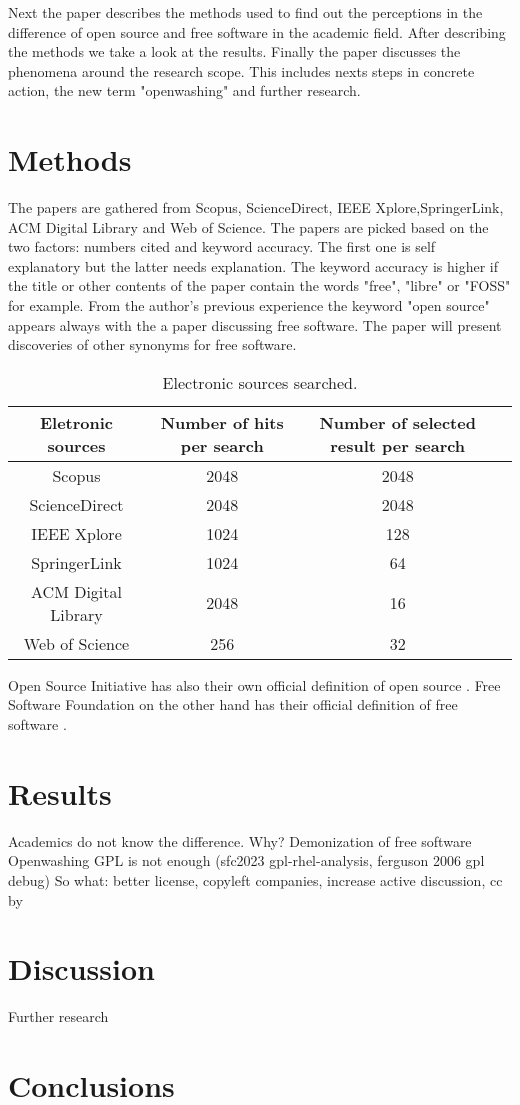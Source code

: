 \documentclass[conference]{IEEEtran}
\begin{document}
Next the paper describes the methods used to find out the perceptions in the difference of open source and free software in the academic field. After describing the methods we take a look at the results. Finally the paper discusses the phenomena around the research scope. This includes nexts steps in concrete action, the new term "openwashing" and further research.

\section{Methods}
The papers are gathered from Scopus, ScienceDirect, IEEE Xplore,SpringerLink, ACM Digital Library and Web of Science. The papers are picked based on the two factors: numbers cited and keyword accuracy. The first one is self explanatory but the latter needs explanation. The keyword accuracy is higher if the title or other contents of the paper contain the words "free", "libre" or "FOSS" for example. From the author's previous experience the keyword "open source" appears always with the a paper discussing free software. The paper will present discoveries of other synonyms for free software.

\begin{table}[htbp]
	\caption{Electronic sources searched.}
	\begin{center}
		\begin{tabular}{|c|c|c|c|}
			\hline
				Eletronic sources & Number of hits per search & Number of selected result per search\\
			\hline
			Scopus & 2048 &  2048\\
			ScienceDirect & 2048 & 2048\\
			IEEE Xplore & 1024 & 128\\
			SpringerLink & 1024 & 64\\
			ACM Digital Library & 2048 & 16\\
			Web of Science & 256 & 32\\
			\hline
		\end{tabular}
		\label{tab1}
	\end{center}
\end{table}

Open Source Initiative has also their own official definition of open source \cite{osd}. Free Software Foundation on the other hand has their official definition of free software \cite{fsd}.

\section{Results}
Academics do not know the difference. Why?
Demonization of free software 
Openwashing
GPL is not enough (sfc2023 gpl-rhel-analysis, ferguson 2006 gpl debug)
So what: better license, copyleft companies, increase active discussion, cc by 

\section{Discussion}
Further research
\section{Conclusions}

{}
\end{document}
